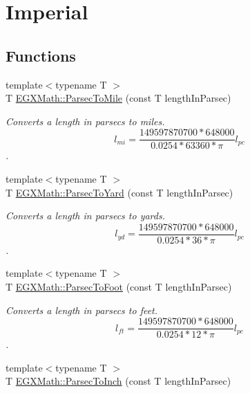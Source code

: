 \hypertarget{group___e_g_x_math-_conversions-_length_conversions-_astronomical-_parsec-_imperial}{}\section{Imperial}
\label{group___e_g_x_math-_conversions-_length_conversions-_astronomical-_parsec-_imperial}
\subsection*{Functions}
\begin{DoxyCompactItemize}
\item 
{\footnotesize template$<$typename T $>$ }\\T \mbox{\hyperlink{group___e_g_x_math-_conversions-_length_conversions-_astronomical-_parsec-_imperial_gaff2c298a0830dd20dc3acce2d9d789f8}{E\+G\+X\+Math\+::\+Parsec\+To\+Mile}} (const T length\+In\+Parsec)
\begin{DoxyCompactList}\small\item\em Converts a length in parsecs to miles. \[ l_{mi}=\frac{149597870700 * 648000}{ 0.0254 * 63360 * \pi} l_{pc} \]. \end{DoxyCompactList}\item 
{\footnotesize template$<$typename T $>$ }\\T \mbox{\hyperlink{group___e_g_x_math-_conversions-_length_conversions-_astronomical-_parsec-_imperial_gae9ae73b70979fb012736516147854cf4}{E\+G\+X\+Math\+::\+Parsec\+To\+Yard}} (const T length\+In\+Parsec)
\begin{DoxyCompactList}\small\item\em Converts a length in parsecs to yards. \[ l_{yd}= \frac{149597870700 * 648000}{0.0254 * 36 * \pi} l_{pc} \]. \end{DoxyCompactList}\item 
{\footnotesize template$<$typename T $>$ }\\T \mbox{\hyperlink{group___e_g_x_math-_conversions-_length_conversions-_astronomical-_parsec-_imperial_ga2c9e8ada868b6915660db313612ac550}{E\+G\+X\+Math\+::\+Parsec\+To\+Foot}} (const T length\+In\+Parsec)
\begin{DoxyCompactList}\small\item\em Converts a length in parsecs to feet. \[ l_{ft}= \frac{149597870700 * 648000}{0.0254 * 12 * \pi} l_{pc} \]. \end{DoxyCompactList}\item 
{\footnotesize template$<$typename T $>$ }\\T \mbox{\hyperlink{group___e_g_x_math-_conversions-_length_conversions-_astronomical-_parsec-_imperial_gaebc7c4ce22fe7ae0ae26420284598c29}{E\+G\+X\+Math\+::\+Parsec\+To\+Inch}} (const T length\+In\+Parsec)

\end{DoxyCompactItemize}
